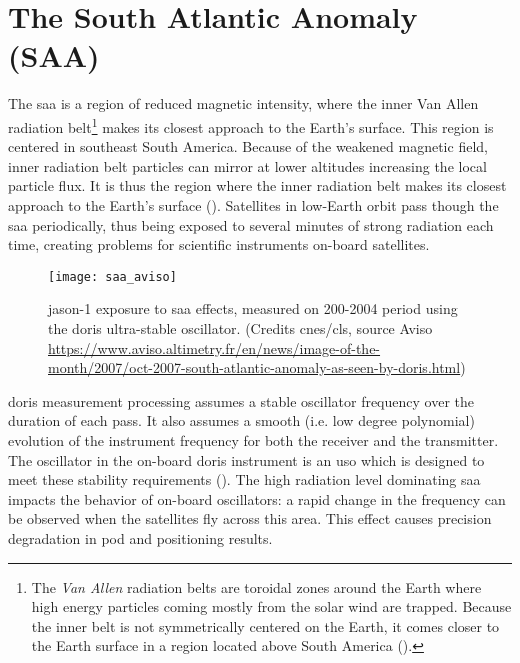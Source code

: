 \section{The South Atlantic Anomaly (SAA)}\label{sec:saa}

\iffalse
https://www.aviso.altimetry.fr/en/news/image-of-the-month/2007/oct-2007-south-atlantic-anomaly-as-seen-by-doris.html
https://ids-doris.org/images/documents/report/ids_workshop_2010/IDS10_s1_Stepanek_Spot5SAA.pdf
\fi

The \gls{saa} is a region of reduced magnetic intensity, where 
the inner Van Allen radiation belt\footnote{The \emph{Van Allen} radiation belts 
are toroidal zones around the Earth where high energy particles coming mostly 
from the solar wind are trapped. Because the inner belt is not symmetrically 
centered on the Earth, it comes closer to the Earth surface in a region 
located above South America (\cite{Jalabert2018}).} makes its closest approach 
to the Earth's surface. This region is centered in southeast South America. Because 
of the weakened magnetic 
field, inner radiation belt particles can mirror at lower altitudes increasing 
the local particle flux. It is thus the region where the inner radiation belt 
makes its closest approach to the Earth's surface (\cite{Anderson2018}). 
Satellites in low-Earth orbit pass though the \gls{saa} periodically, thus being 
exposed to several minutes of strong radiation each time, creating problems for 
scientific instruments on-board satellites.

\begin{figure}
  \centering
  \texttt{[image: saa\_aviso]}
  \caption{\gls{jason}-1 exposure to \gls{saa} effects, measured on 200-2004 
    period using the \gls{doris} ultra-stable oscillator. (Credits \gls{cnes}/\gls{cls}, 
    source Aviso \url{https://www.aviso.altimetry.fr/en/news/image-of-the-month/2007/oct-2007-south-atlantic-anomaly-as-seen-by-doris.html})}
  \label{fig:saa-aviso}
\end{figure}

\gls{doris} measurement processing assumes a stable oscillator frequency over 
the duration of each pass. It also assumes a smooth (i.e. low degree polynomial) 
evolution of the instrument frequency for both the receiver and the transmitter. 
The oscillator in the on-board \gls{doris} instrument is an \gls{uso} which is 
designed to meet these stability requirements (\cite{Jalabert2018}).
The high radiation level dominating \gls{saa} impacts the behavior of on-board 
oscillators: a rapid change in the frequency can be observed when the satellites 
fly across this area. This effect causes precision degradation in \gls{pod} and 
positioning results.

